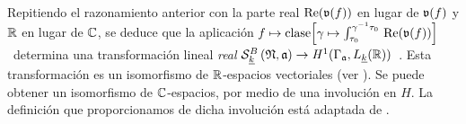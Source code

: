 \begin{obsCohomologiaReal}\label{obs:cohomologiareal}
	Repitiendo el razonamiento anterior con la parte real
	$\Re(\frak{v}(f))$ en lugar de $\frak{v}(f)$ y $\bb{R}$ en lugar de
	$\bb{C}$, se deduce que la aplicaci\'{o}n
	\begin{math}
		f\mapsto\text{clase}\Big[\gamma\mapsto
			\int_{\tau_{0}}^{\gamma^{-1}\tau_{0}}\,
			\Re(\frak{v}(f))\Big]
	\end{math}~determina una transformaci\'{o}n lineal \emph{real}
	\begin{math}
		\spitzH[B]{k}{\frak{N},\frak{a}}\rightarrow
			\cohomolo[1]{\Gamma_{\frak{a}},L_{\peso{k}}(\bb{R})}
	\end{math}~.
	Esta transformaci\'{o}n es un isomorfismo de $\bb{R}$-espacios
	vectoriales (ver \cite[Thm.~8.4]{ShimuraIntroduction}).
	Se puede obtener un isomorfismo de $\bb{C}$-espacios, por medio de una
	involuci\'{o}n en $H$. La definici\'{o}n que proporcionamos de dicha
	involuci\'{o}n est\'{a} adaptada de
	\cite[\S~2.4]{VoightComputingOverArbitrary}.
\end{obsCohomologiaReal}

